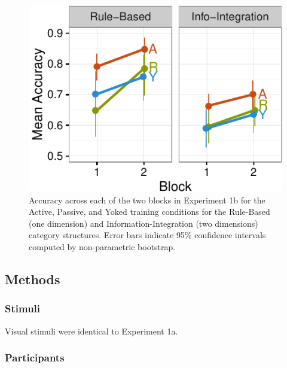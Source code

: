 \documentclass[10pt, letterpaper]{article}
\newenvironment{CodeChunk}{}{}
\begin{document}
\begin{CodeChunk}
\begin{figure}[t]

\includegraphics{figs/rep1b-acc-plot-1} \hfill{}

\caption[Accuracy across each of the two blocks in Experiment 1b for the Active, Passive, and Yoked training conditions for the Rule-Based (one dimension) and Information-Integration (two dimensions) category structures]{Accuracy across each of the two blocks in Experiment 1b for the Active, Passive, and Yoked training conditions for the Rule-Based (one dimension) and Information-Integration (two dimensions) category structures. Error bars indicate 95\% confidence intervals computed by non-parametric bootstrap.}\label{fig:rep1b-acc-plot}
\end{figure}
\end{CodeChunk}

\subsection{Methods}\label{methods-1}

\subsubsection{Stimuli}\label{stimuli-1}

Visual stimuli were identical to Experiment 1a.

\subsubsection{Participants}\label{participants-1}
\end{document}
